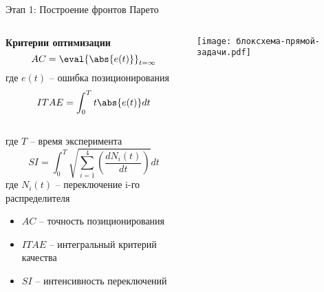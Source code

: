 \begin{frame}{Этап 1: Построение фронтов Парето}
	\begin{columns}[]
		\begin{column}{0.5\textwidth}
			\vspace{-0.3cm}
			\begin{block}{\scriptsize \textbf{Критерии оптимизации}}
				\scriptsize
				$$ AC = \eval{\abs{e(t)}}_{t=\infty}$$
				где $e(t)$ -- ошибка позиционирования \\
				$$ITAE = \int_{0}^{T} t\abs{e(t)} dt$$\\
				где $T$ -- время эксперимента \\
				$$ SI = \int_0^T \sqrt{\sum_{i=1}^4 \left( \frac{dN_i(t)}{dt} \right)}dt$$
				где $N_i(t)$ -- переключение i-го распределителя
				\begin{itemize}
					\footnotesize
					\item \scriptsize $AC$ -- точность позиционирования
					\item \scriptsize $ITAE$ -- интегральный критерий качества
					\item \scriptsize $SI$ -- интенсивность переключений
				\end{itemize}
			\end{block}

		\end{column}

		\begin{column}{0.5\textwidth}
			\texttt{[image: блоксхема-прямой-задачи.pdf]}
		\end{column}
	\end{columns}
\end{frame}


